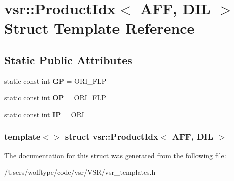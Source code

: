 \hypertarget{structvsr_1_1_product_idx_3_01_a_f_f_00_01_d_i_l_01_4}{\section{vsr\-:\-:Product\-Idx$<$ A\-F\-F, D\-I\-L $>$ Struct Template Reference}
\label{structvsr_1_1_product_idx_3_01_a_f_f_00_01_d_i_l_01_4}
}
\subsection*{Static Public Attributes}
\begin{DoxyCompactItemize}
\item 
\hypertarget{structvsr_1_1_product_idx_3_01_a_f_f_00_01_d_i_l_01_4_abcf04a90e4beb819d5b4ad61aab84194}{static const int {\bfseries G\-P} = O\-R\-I\-\_\-\-F\-L\-P}\label{structvsr_1_1_product_idx_3_01_a_f_f_00_01_d_i_l_01_4_abcf04a90e4beb819d5b4ad61aab84194}

\item 
\hypertarget{structvsr_1_1_product_idx_3_01_a_f_f_00_01_d_i_l_01_4_af246cec19890494d00758a5f0a1c9752}{static const int {\bfseries O\-P} = O\-R\-I\-\_\-\-F\-L\-P}\label{structvsr_1_1_product_idx_3_01_a_f_f_00_01_d_i_l_01_4_af246cec19890494d00758a5f0a1c9752}

\item 
\hypertarget{structvsr_1_1_product_idx_3_01_a_f_f_00_01_d_i_l_01_4_a8f10eaafe276f4d7d52f0bb459b5e9a4}{static const int {\bfseries I\-P} = O\-R\-I}\label{structvsr_1_1_product_idx_3_01_a_f_f_00_01_d_i_l_01_4_a8f10eaafe276f4d7d52f0bb459b5e9a4}

\end{DoxyCompactItemize}
\subsubsection*{template$<$$>$ struct vsr\-::\-Product\-Idx$<$ A\-F\-F, D\-I\-L $>$}



The documentation for this struct was generated from the following file\-:\begin{DoxyCompactItemize}
\item 
/\-Users/wolftype/code/vsr/\-V\-S\-R/vsr\-\_\-templates.\-h\end{DoxyCompactItemize}
